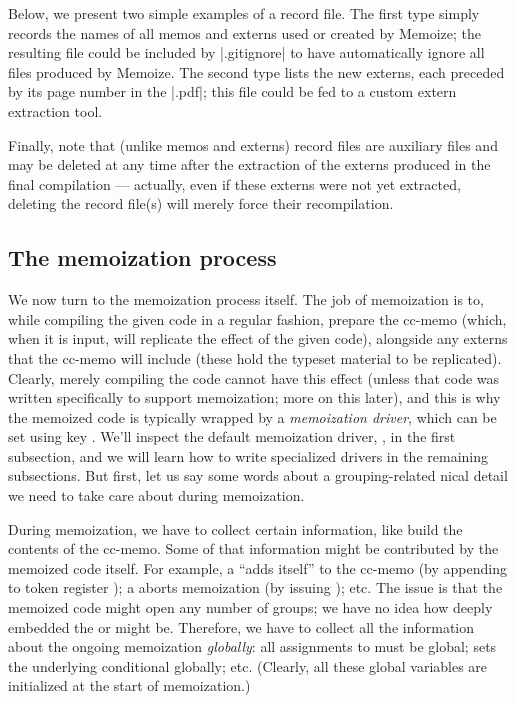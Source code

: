 \documentclass[a4paper,11pt]{article}
\begin{document}
Below, we present two simple examples of a record file.  The first type simply
records the names of all memos and externs used or created by Memoize; the
resulting file could be included by |.gitignore| to have
 automatically ignore all files produced by
Memoize.  The second type lists the new externs, each preceded by its page
number in the |.pdf|; this file could be fed to a custom extern extraction
tool.



Finally, note that (unlike memos and externs) record files are auxiliary files
and may be deleted at any time after the extraction of the externs produced in
the final compilation --- actually, even if these externs were not yet
extracted, deleting the record file(s) will merely force their recompilation.


\subsection{The memoization process}
\label{sec:memoization-drivers}

We now turn to the memoization process itself.  The job of memoization is to,
while compiling the given code in a regular fashion, prepare the cc-memo
(which, when it is input, will replicate the effect of the given code),
alongside any externs that the cc-memo will include (these hold the typeset
material to be replicated).  Clearly, merely compiling the code cannot have
this effect (unless that code was written specifically to support memoization;
more on this later), and this is why the memoized code is typically wrapped by
a \emph{memoization driver}, which can be set using key .
We'll inspect the default memoization driver, ,
in the first subsection, and we will learn how to write specialized drivers in
the remaining subsections.  But first, let us say some words about a
grouping-related nical detail we need to take care about during
memoization.

During memoization, we have to collect certain information, like build the
contents of the cc-memo.  Some of that information might be contributed by the
memoized code itself.  For example, a  ``adds itself'' to the cc-memo
(by appending to token register ); a
 aborts memoization (by issuing
); etc.  The issue is that the memoized code might open any
number of  groups; we have no idea how deeply embedded the
 or  might be.  Therefore, we have
to collect all the information about the ongoing memoization \emph{globally}:
all assignments to  must be global;  sets
the underlying conditional globally; etc.  (Clearly, all these global variables
are initialized at the start of memoization.)
\end{document}
